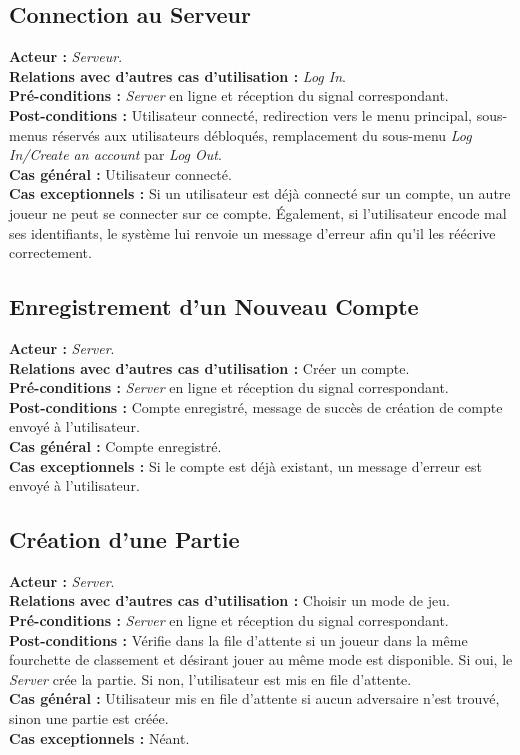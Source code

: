 \documentclass[10pt, a4paper]{article}
\begin{document}
\subsection{Connection au Serveur}
\textbf{Acteur :} \textit{Serveur}. \\
\textbf{Relations avec d'autres cas d'utilisation :} \textit{Log In}. \\
\textbf{Pré-conditions :} \textit{Server} en ligne et réception du signal correspondant. \\
\textbf{Post-conditions :} Utilisateur connecté, redirection vers le menu principal, sous-menus réservés aux utilisateurs débloqués, remplacement du sous-menu \textit{Log In/Create an account} par \textit{Log Out}. \\
\textbf{Cas général :} Utilisateur connecté. \\
\textbf{Cas exceptionnels :} Si un utilisateur est déjà connecté sur un compte, un autre joueur ne peut se connecter sur ce compte. Également, si l’utilisateur encode mal ses identifiants, le système lui renvoie un message d’erreur afin qu’il les réécrive correctement. \\

\subsection{Enregistrement d'un Nouveau Compte}
\textbf{Acteur :} \textit{Server}. \\
\textbf{Relations avec d'autres cas d'utilisation :} Créer un compte. \\
\textbf{Pré-conditions :} \textit{Server} en ligne et réception du signal correspondant. \\
\textbf{Post-conditions :} Compte enregistré, message de succès de création de compte envoyé à l'utilisateur. \\
\textbf{Cas général :} Compte enregistré. \\
\textbf{Cas exceptionnels :} Si le compte est déjà existant, un message d'erreur est envoyé à l'utilisateur. \\

\subsection{Création d'une Partie}
\textbf{Acteur :} \textit{Server}. \\
\textbf{Relations avec d'autres cas d'utilisation :} Choisir un mode de jeu. \\
\textbf{Pré-conditions :} \textit{Server} en ligne et réception du signal correspondant. \\
\textbf{Post-conditions :} Vérifie dans la file d'attente si un joueur dans la même fourchette de classement et désirant jouer au même mode est disponible. Si oui, le \textit{Server} crée la partie. Si non, l'utilisateur est mis en file d'attente. \\
\textbf{Cas général :} Utilisateur mis en file d'attente si aucun adversaire n'est trouvé, sinon une partie est créée. \\
\textbf{Cas exceptionnels :} Néant. \\
\end{document}
